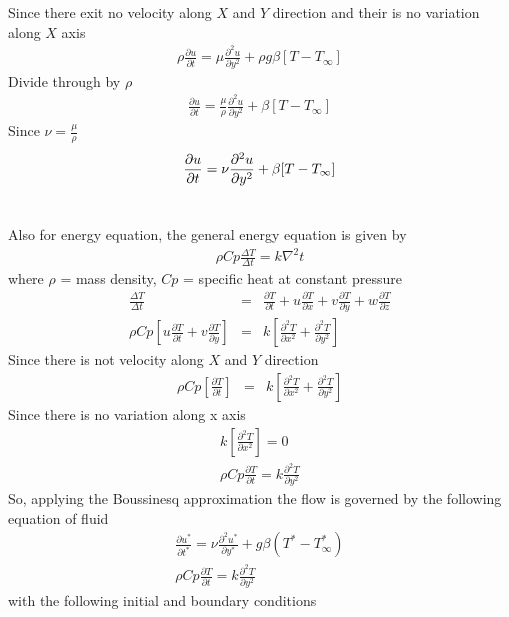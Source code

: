 \documentclass[11pt]{report}
\newcommand{\sps}{\\[0.2cm]}
\newcommand{\dsp}{\displaystyle}
\begin{document}
	Since there exit no velocity along $X$ and $Y$ direction and their is no variation along $X$ axis
	\begin{eqnarray}
		\rho\frac{\partial u}{\partial t} = \mu\frac{\partial^2 u}{\partial y^2} + \rho g\beta[T-T_\infty]
	\end{eqnarray}
	Divide through by $\rho$
	\begin{eqnarray}
		\frac{\partial u}{\partial t} = \frac{\mu}{\rho}\frac{\partial^2 u}{\partial y^2} + \beta[T-T_\infty]
	\end{eqnarray}
	Since $\dsp \nu = \frac{\mu}{\rho}$
	\begin{eqnarray}
		\frac{\partial u}{\partial t} = \nu\frac{\partial^2 u}{\partial y^2} + \beta[T-T_\infty]\sps \notag
	\end{eqnarray}
	Also for energy equation, the general energy equation is given by
	\begin{eqnarray}
		\rho Cp\frac{\Delta T}{\Delta t} = k \nabla^2 t
	\end{eqnarray}
	where $\rho$ = mass density, $Cp$ = specific heat at constant pressure
	\begin{eqnarray}
		\frac{\Delta T}{\Delta t} &=& \frac{\partial T}{\partial t} + u\frac{\partial T}{\partial x} + v\frac{\partial T}{\partial y}+ w\frac{\partial T}{\partial z}\sps
		\rho Cp\left[u\frac{\partial T}{\partial t} + v\frac{\partial T}{\partial y}\right] &=& k\left[\frac{\partial^2 T}{\partial x^2} + \frac{\partial^2 T}{\partial y^2}\right]
	\end{eqnarray}
	Since there is not velocity along $X$ and $Y$ direction
	\begin{eqnarray}
		\rho Cp\left[\frac{\partial T}{\partial t} \right] &=& k\left[\frac{\partial^2 T}{\partial x^2} + \frac{\partial^2 T}{\partial y^2}\right]
	\end{eqnarray}
	Since there is no variation along x axis
	\begin{eqnarray}
		k\left[\frac{\partial^2 T}{\partial x^2}\right] = 0\sps
		\rho Cp \frac{\partial T}{\partial t} = k\frac{\partial^2 T}{\partial y^2}
	\end{eqnarray}
	So, applying the Boussinesq approximation the flow is governed by the following equation of fluid
	\begin{eqnarray*}
		\frac{\partial u^*}{\partial t^*}= \nu\frac{\partial^2 u^*}{\partial y^*} + g\beta(T^* - T^*_\infty)\sps
		\rho Cp\frac{\partial T}{\partial t} = k\frac{\partial^2 T}{\partial y^2}
	\end{eqnarray*}
	with the following initial and boundary conditions
\end{document}

